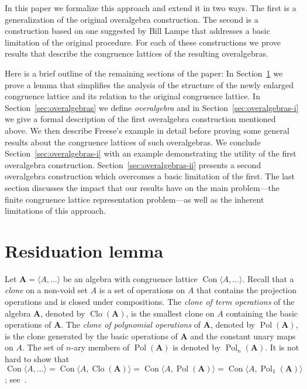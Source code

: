 \documentclass{au}
\numberwithin{equation}{section}
\theoremstyle{plain}
\theoremstyle{definition}
\newcommand{\defeq}{\ensuremath{=}}        %
\newcommand{\<}{\ensuremath{\langle}}
\renewcommand{\>}{\ensuremath{\rangle}}
\newcommand{\bA}{\ensuremath{\mathbf{A}}}
\DeclareMathOperator{\Con}{Con}
\DeclareMathOperator{\Pol}{Pol}
\DeclareMathOperator{\Clo}{Clo}
\begin{document}
In this paper we formalize this approach and extend it in two ways.  The first
is a generalization of the original overalgebra construction.
The second is a construction based on one suggested by Bill Lampe that
addresses a basic limitation of the original procedure.  For each of these
constructions we prove results that describe the congruence
lattices of the resulting overalgebras.

Here is a brief outline of the remaining sections of the paper:
In Section~\ref{sec:residuation-lemma} we prove a lemma that simplifies
the analysis of the structure of the newly enlarged congruence lattice and
its relation to the original congruence lattice.
In Section~\ref{sec:overalgebras} we define {\it overalgebra} and in
Section~\ref{sec:overalgebras-i} we give a formal description of
the first overalgebra construction mentioned above.  We then describe Freese's
example in detail before proving some general results about
the congruence lattices of such overalgebras.
We conclude Section~\ref{sec:overalgebras-i} with an example demonstrating the
utility of the first overalgebra construction.
Section~\ref{sec:overalgebras-ii}
presents a second overalgebra construction which overcomes a basic limitation
of the first.
The last section discusses the impact that our results
have on the main problem---the finite congruence lattice representation problem---as well as the inherent limitations of this approach.

\section{Residuation lemma} %
\label{sec:residuation-lemma}
Let $\bA \defeq  \<A, \dots \>$ be an algebra with congruence lattice $\Con\<A, \dots \>$.
Recall that a \emph{clone} on a non-void set $A$ is a set of operations on $A$
that contains the projection operations and is closed under compositions.
The \emph{clone of term operations} of the algebra $\bA$, denoted by $\Clo (\bA)$,
is the smallest clone on $A$ containing the basic operations of $\bA$.
The \emph{clone of polynomial operations} of $\bA$, denoted by
$\Pol(\bA)$, is the clone generated by the basic operations
of $\bA$ and the constant unary maps on $A$. The set of $n$-ary members of
$\Pol(\bA)$ is denoted by $\Pol_n(\bA)$.
It is not hard to show that
$\Con\<A, \dots \>  = \Con \<A, \Clo (\bA)\> = \Con \<A, \Pol (\bA)\>= %
\Con \<A, \Pol_1 (\bA)\>$; see~\cite[Theorem~4.18]{alvi:1987}.
\end{document}
